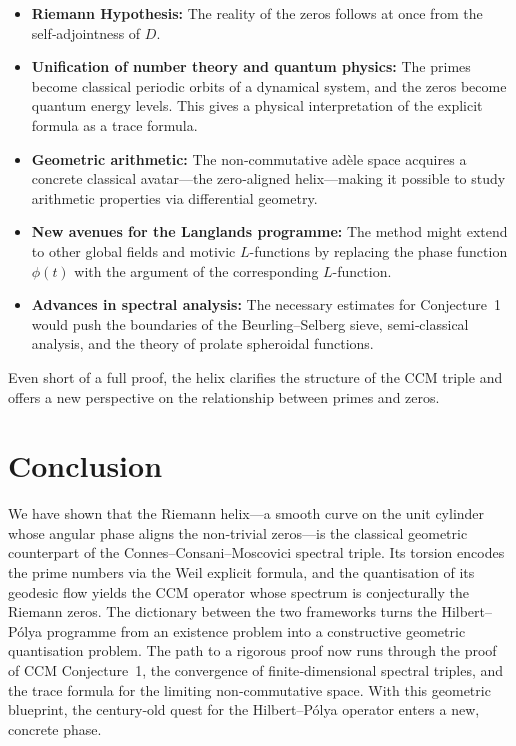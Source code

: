 \documentclass[12pt,a4paper]{article}
\begin{document}
\begin{itemize}
\item \textbf{Riemann Hypothesis:} The reality of the zeros follows at once from the self‑adjointness of \(D\).
\item \textbf{Unification of number theory and quantum physics:} The primes become classical periodic orbits of a dynamical system, and the zeros become quantum energy levels. This gives a physical interpretation of the explicit formula as a trace formula.
\item \textbf{Geometric arithmetic:} The non‑commutative adèle space acquires a concrete classical avatar—the zero‑aligned helix—making it possible to study arithmetic properties via differential geometry.
\item \textbf{New avenues for the Langlands programme:} The method might extend to other global fields and motivic \(L\)-functions by replacing the phase function \(\phi(t)\) with the argument of the corresponding \(L\)-function.
\item \textbf{Advances in spectral analysis:} The necessary estimates for Conjecture~1 would push the boundaries of the Beurling–Selberg sieve, semi‑classical analysis, and the theory of prolate spheroidal functions.
\end{itemize}

Even short of a full proof, the helix clarifies the structure of the CCM triple and offers a new perspective on the relationship between primes and zeros.

\section{Conclusion}
We have shown that the Riemann helix—a smooth curve on the unit cylinder whose angular phase aligns the non‑trivial zeros—is the classical geometric counterpart of the Connes–Consani–Moscovici spectral triple. Its torsion encodes the prime numbers via the Weil explicit formula, and the quantisation of its geodesic flow yields the CCM operator whose spectrum is conjecturally the Riemann zeros. The dictionary between the two frameworks turns the Hilbert–P\'olya programme from an existence problem into a constructive geometric quantisation problem. The path to a rigorous proof now runs through the proof of CCM Conjecture~1, the convergence of finite‑dimensional spectral triples, and the trace formula for the limiting non‑commutative space. With this geometric blueprint, the century‑old quest for the Hilbert–P\'olya operator enters a new, concrete phase.
\end{document}
